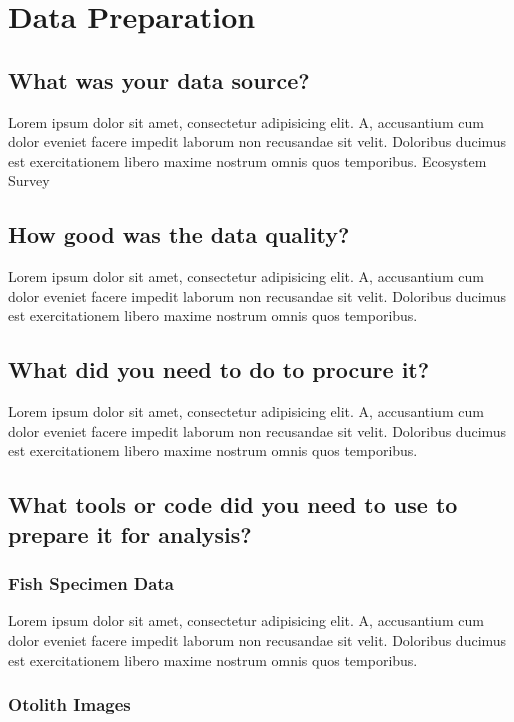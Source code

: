 \section{Data Preparation}

\subsection{What was your data source?}

Lorem ipsum dolor sit amet, consectetur adipisicing elit. A, accusantium cum dolor eveniet facere impedit laborum non recusandae sit velit. Doloribus ducimus est exercitationem libero maxime nostrum omnis quos temporibus.
Ecosystem Survey ~\cite{groundfish}

\subsection{How good was the data quality?}

Lorem ipsum dolor sit amet, consectetur adipisicing elit. A, accusantium cum dolor eveniet facere impedit laborum non recusandae sit velit. Doloribus ducimus est exercitationem libero maxime nostrum omnis quos temporibus.

\subsection{What did you need to do to procure it?}

Lorem ipsum dolor sit amet, consectetur adipisicing elit. A, accusantium cum dolor eveniet facere impedit laborum non recusandae sit velit. Doloribus ducimus est exercitationem libero maxime nostrum omnis quos temporibus.
\subsection{What tools or code did you need to use to prepare it for analysis?}

\subsubsection{Fish Specimen Data}

Lorem ipsum dolor sit amet, consectetur adipisicing elit. A, accusantium cum dolor eveniet facere impedit laborum non recusandae sit velit. Doloribus ducimus est exercitationem libero maxime nostrum omnis quos temporibus.

\subsubsection{Otolith Images}

